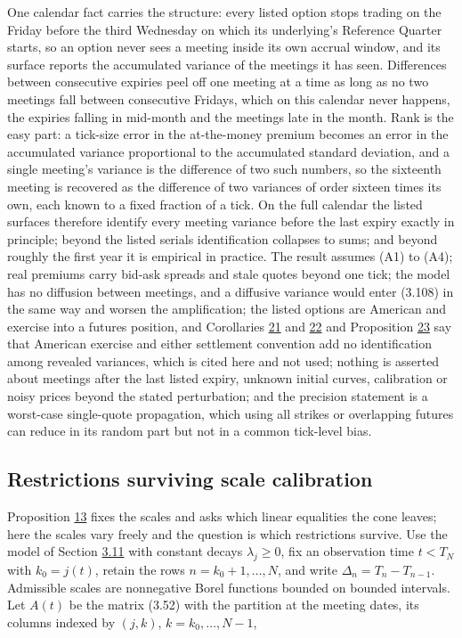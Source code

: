\documentclass[11pt]{article}
\begin{document}
One calendar fact carries the structure: every listed option stops trading on the Friday before the third Wednesday on which its underlying's Reference Quarter starts, so an option never sees a meeting inside its own accrual window, and its surface reports the accumulated variance of the meetings it has seen. Differences between consecutive expiries peel off one meeting at a time as long as no two meetings fall between consecutive Fridays, which on this calendar never happens, the expiries falling in mid-month and the meetings late in the month. Rank is the easy part: a tick-size error in the at-the-money premium becomes an error in the accumulated variance proportional to the accumulated standard deviation, and a single meeting's variance is the difference of two such numbers, so the sixteenth meeting is recovered as the difference of two variances of order sixteen times its own, each known to a fixed fraction of a tick. On the full calendar the listed surfaces therefore identify every meeting variance before the last expiry exactly in principle; beyond the listed serials identification collapses to sums; and beyond roughly the first year it is empirical in practice. The result assumes (A1) to (A4); real premiums carry bid-ask spreads and stale quotes beyond one tick; the model has no diffusion between meetings, and a diffusive variance would enter (3.108) in the same way and worsen the amplification; the listed options are American and exercise into a futures position, and Corollaries \hyperref[res:Corollary-21]{21} and \hyperref[res:Corollary-22]{22} and Proposition \hyperref[res:Proposition-23]{23} say that American exercise and either settlement convention add no identification among revealed variances, which is cited here and not used; nothing is asserted about meetings after the last listed expiry, unknown initial curves, calibration or noisy prices beyond the stated perturbation; and the precision statement is a worst-case single-quote propagation, which using all strikes or overlapping futures can reduce in its random part but not in a common tick-level bias.

\subsection{Restrictions surviving scale calibration}\label{sec:3.22}

Proposition \hyperref[res:Proposition-13]{13} fixes the scales and asks which linear equalities the cone leaves; here the scales vary freely and the question is which restrictions survive. Use the model of Section \hyperref[sec:3.11]{3.11} with constant decays \(\lambda_j \ge 0\), fix an observation time \(t < T_N\) with \(k_0 = j(t)\), retain the rows \(n = k_0 + 1, \dots, N\), and write \(\Delta_n = T_n - T_{n-1}\). Admissible scales are nonnegative Borel functions bounded on bounded intervals. Let \(A(t)\) be the matrix (3.52) with the partition at the meeting dates, its columns indexed by \((j, k)\), \(k = k_0, \dots, N - 1\),
\end{document}

